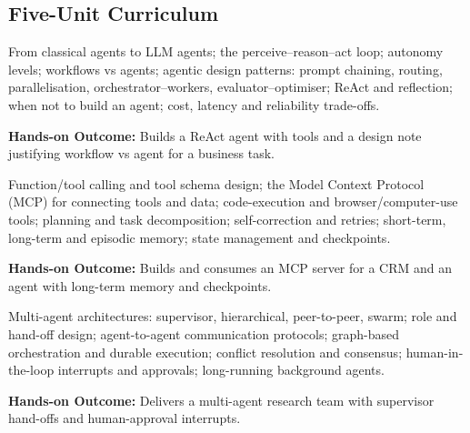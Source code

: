 \documentclass[10pt,a4paper]{article}
\begin{document}
\subsection*{Five-Unit Curriculum}
\begin{tcolorbox}[unitbox,title={{\color{gold}UNIT I}\quad Foundations of AI Agents\hfill{\color{gold}9 Hours}}]\small From classical agents to LLM agents; the perceive–reason–act loop; autonomy levels; workflows vs agents; agentic design patterns: prompt chaining, routing, parallelisation, orchestrator–workers, evaluator–optimiser; ReAct and reflection; when not to build an agent; cost, latency and reliability trade-offs.\par\vspace{2pt}\par\textbf{Hands-on Outcome:} Builds a ReAct agent with tools and a design note justifying workflow vs agent for a business task.\end{tcolorbox}
\begin{tcolorbox}[unitbox,title={{\color{gold}UNIT II}\quad Tools, Planning and Memory\hfill{\color{gold}9 Hours}}]\small Function/tool calling and tool schema design; the Model Context Protocol (MCP) for connecting tools and data; code-execution and browser/computer-use tools; planning and task decomposition; self-correction and retries; short-term, long-term and episodic memory; state management and checkpoints.\par\vspace{2pt}\par\textbf{Hands-on Outcome:} Builds and consumes an MCP server for a CRM and an agent with long-term memory and checkpoints.\end{tcolorbox}
\begin{tcolorbox}[unitbox,title={{\color{gold}UNIT III}\quad Multi-Agent Systems and Orchestration\hfill{\color{gold}9 Hours}}]\small Multi-agent architectures: supervisor, hierarchical, peer-to-peer, swarm; role and hand-off design; agent-to-agent communication protocols; graph-based orchestration and durable execution; conflict resolution and consensus; human-in-the-loop interrupts and approvals; long-running background agents.\par\vspace{2pt}\par\textbf{Hands-on Outcome:} Delivers a multi-agent research team with supervisor hand-offs and human-approval interrupts.\end{tcolorbox}
\end{document}
